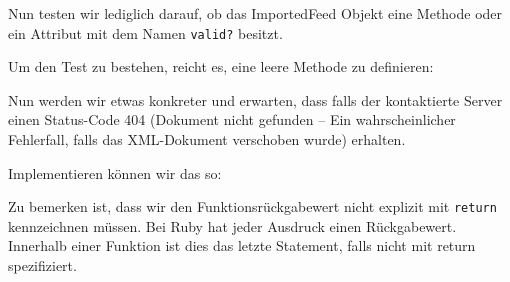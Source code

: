 Nun testen wir lediglich darauf, ob das ImportedFeed Objekt eine Methode oder ein Attribut mit dem Namen \texttt{valid?} besitzt.

Um den Test zu bestehen, reicht es, eine leere Methode zu definieren:
\begin{ruby}[label=lib/imported\_job.rb]
   
\end{ruby}

\tddgreen
Nun werden wir etwas konkreter und erwarten, dass falls der kontaktierte Server einen Status-Code 404 (Dokument nicht gefunden -- Ein wahrscheinlicher Fehlerfall, falls das XML-Dokument verschoben wurde) erhalten.
\begin{ruby}[label=test/test\_imported\_job.rb]
  
     
    
   
\end{ruby}

\tddred

Implementieren können wir das so:

\begin{ruby}[label=ib/imported\_job.rb]
 
    
   
      
      
      

   
      
\end{ruby}


\tddgreen
Zu bemerken ist, dass wir den Funktionsrückgabewert nicht explizit mit \texttt{return} kennzeichnen müssen. Bei Ruby hat jeder Ausdruck einen Rückgabewert. Innerhalb einer Funktion ist dies das letzte Statement, falls nicht mit return spezifiziert.

